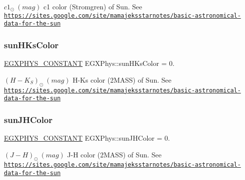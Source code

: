 $ c1_{\odot} \ (mag)$ c1 color (Stromgren) of Sun. See \href{https://sites.google.com/site/mamajeksstarnotes/basic-astronomical-data-for-the-sun}{\tt https\+://sites.\+google.\+com/site/mamajeksstarnotes/basic-\/astronomical-\/data-\/for-\/the-\/sun} \mbox{\label{group___e_g_x_phys-_constants-_astrophysics-_solar_system-_sun-_magnitude_gafed7fac94b45769da99c9e002a12e8c2}} 
\subsubsection{\texorpdfstring{sun\+H\+Ks\+Color}{sunHKsColor}}
{\footnotesize\ttfamily \mbox{\hyperlink{group___e_g_x_phys-_constants-_macros_ga76980d288494ce1714c9ac68a95ba702}{E\+G\+X\+P\+H\+Y\+S\+\_\+\+C\+O\+N\+S\+T\+A\+NT}} E\+G\+X\+Phys\+::sun\+H\+Ks\+Color = 0.}

$ (H-K_S)_{\odot} \ (mag)$ H-\/\+Ks color (2\+M\+A\+SS) of Sun. See \href{https://sites.google.com/site/mamajeksstarnotes/basic-astronomical-data-for-the-sun}{\tt https\+://sites.\+google.\+com/site/mamajeksstarnotes/basic-\/astronomical-\/data-\/for-\/the-\/sun} \mbox{\label{group___e_g_x_phys-_constants-_astrophysics-_solar_system-_sun-_magnitude_ga9874d5f0fa26e7495e984f9849463aaf}} 
\subsubsection{\texorpdfstring{sun\+J\+H\+Color}{sunJHColor}}
{\footnotesize\ttfamily \mbox{\hyperlink{group___e_g_x_phys-_constants-_macros_ga76980d288494ce1714c9ac68a95ba702}{E\+G\+X\+P\+H\+Y\+S\+\_\+\+C\+O\+N\+S\+T\+A\+NT}} E\+G\+X\+Phys\+::sun\+J\+H\+Color = 0.}

$ (J-H)_{\odot} \ (mag)$ J-\/H color (2\+M\+A\+SS) of Sun. See \href{https://sites.google.com/site/mamajeksstarnotes/basic-astronomical-data-for-the-sun}{\tt https\+://sites.\+google.\+com/site/mamajeksstarnotes/basic-\/astronomical-\/data-\/for-\/the-\/sun} \mbox{\label{group___e_g_x_phys-_constants-_astrophysics-_solar_system-_sun-_magnitude_ga6b8eb63d48100ce4074dfba6da0f0969}} 
